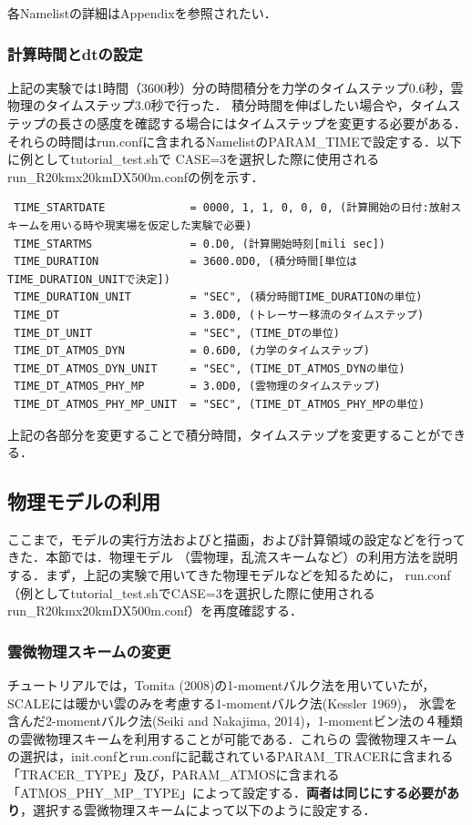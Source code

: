 各Namelistの詳細はAppendixを参照されたい．

\subsubsection{計算時間とdtの設定}
上記の実験では1時間（3600秒）分の時間積分を力学のタイムステップ0.6秒，雲物理のタイムステップ3.0秒で行った．
積分時間を伸ばしたい場合や，タイムステップの長さの感度を確認する場合にはタイムステップを変更する必要がある．
それらの時間はrun.confに含まれるNamelistのPARAM\_TIMEで設定する．以下に例としてtutorial\_test.shで
CASE=3を選択した際に使用されるrun\_R20kmx20kmDX500m.confの例を示す．

\begin{verbatim}
 TIME_STARTDATE             = 0000, 1, 1, 0, 0, 0, (計算開始の日付:放射スキームを用いる時や現実場を仮定した実験で必要)
 TIME_STARTMS               = 0.D0, (計算開始時刻[mili sec])
 TIME_DURATION              = 3600.0D0, (積分時間[単位はTIME_DURATION_UNITで決定])
 TIME_DURATION_UNIT         = "SEC", (積分時間TIME_DURATIONの単位)
 TIME_DT                    = 3.0D0, (トレーサー移流のタイムステップ)
 TIME_DT_UNIT               = "SEC", (TIME_DTの単位)
 TIME_DT_ATMOS_DYN          = 0.6D0, (力学のタイムステップ)
 TIME_DT_ATMOS_DYN_UNIT     = "SEC", (TIME_DT_ATMOS_DYNの単位)
 TIME_DT_ATMOS_PHY_MP       = 3.0D0, (雲物理のタイムステップ)
 TIME_DT_ATMOS_PHY_MP_UNIT  = "SEC", (TIME_DT_ATMOS_PHY_MPの単位)
\end{verbatim}

上記の各部分を変更することで積分時間，タイムステップを変更することができる．

\subsection{物理モデルの利用}
ここまで，モデルの実行方法およびと描画，および計算領域の設定などを行ってきた．本節では．物理モデル
（雲物理，乱流スキームなど）の利用方法を説明する．まず，上記の実験で用いてきた物理モデルなどを知るために，
run.conf（例としてtutorial\_test.shでCASE=3を選択した際に使用されるrun\_R20kmx20kmDX500m.conf）を再度確認する．


\subsubsection{雲微物理スキームの変更}
チュートリアルでは，Tomita (2008)の1-momentバルク法を用いていたが，SCALEには暖かい雲のみを考慮する1-momentバルク法(Kessler 1969)，
氷雲を含んだ2-momentバルク法(Seiki and Nakajima, 2014)，1-momentビン法の４種類の雲微物理スキームを利用することが可能である．これらの
雲微物理スキームの選択は，init.confとrun.confに記載されているPARAM\_TRACERに含まれる「TRACER\_TYPE」及び，PARAM\_ATMOSに含まれる
「ATMOS\_PHY\_MP\_TYPE」によって設定する．{\bf 両者は同じにする必要があり}，選択する雲微物理スキームによって以下のように設定する．

